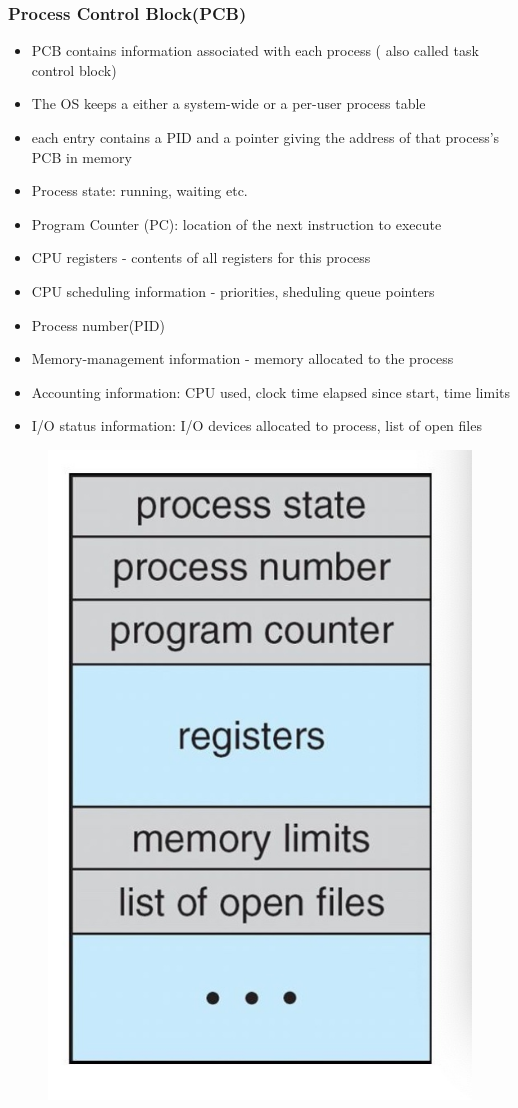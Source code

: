 \documentclass[11pt]{article}
\theoremstyle{definition}
\begin{document}
        \subsubsection{Process Control Block(PCB)}
        \begin{itemize}
            \item PCB contains information associated with each process ( also called task control block)
            \item The OS keeps a either a system-wide or a per-user process table
            \item each entry contains a PID and a pointer giving the address of that process's PCB in memory
            \item Process state: running, waiting etc.
            \item Program Counter (PC): location of the next instruction to execute
            \item CPU registers - contents of all registers for this process
            \item CPU scheduling information - priorities, sheduling queue pointers
            \item Process number(PID)
            \item Memory-management information - memory allocated to the process
            \item Accounting information: CPU used, clock time elapsed since start, time limits
            \item I/O status information: I/O devices allocated to process, list of open files
        \end{itemize}
        \begin{figure}[htbp]
            \centering
                \includegraphics[width=0.30\linewidth]{Operating System/img/PCB.jpg}
                \label{fig:enter-label}
            \end{figure}
\end{document}
